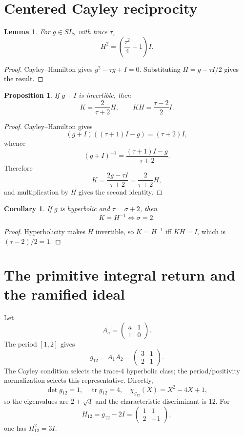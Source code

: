 \documentclass[11pt]{article}
\newtheorem{proposition}[theorem]{Proposition}
\newtheorem{corollary}[theorem]{Corollary}
\newtheorem{lemma}[theorem]{Lemma}
\theoremstyle{remark}
\newcommand{\tr}{\operatorname{tr}}
\begin{document}
\section{Centered Cayley reciprocity}

\begin{lemma}
For $g\in SL_2$ with trace $\tau$,
\[
H^2=\left(\frac{\tau^2}{4}-1\right)I.
\]
\end{lemma}
\begin{proof}
Cayley--Hamilton gives $g^2-\tau g+I=0$.  Substituting
$H=g-\tau I/2$ gives the result.
\end{proof}

\begin{proposition}
If $g+I$ is invertible, then
\[
K=\frac{2}{\tau+2}H,
\qquad KH=\frac{\tau-2}{2}I.
\]
\end{proposition}
\begin{proof}
Cayley--Hamilton gives
\[
(g+I)((\tau+1)I-g)=(\tau+2)I,
\]
whence
\[
(g+I)^{-1}=\frac{(\tau+1)I-g}{\tau+2}.
\]
Therefore
\[
K=\frac{2g-\tau I}{\tau+2}=\frac{2}{\tau+2}H,
\]
and multiplication by $H$ gives the second identity.
\end{proof}

\begin{corollary}
If $g$ is hyperbolic and $\tau=\sigma+2$, then
\[
K=H^{-1}\iff\sigma=2.
\]
\end{corollary}
\begin{proof}
Hyperbolicity makes $H$ invertible, so $K=H^{-1}$ iff $KH=I$, which is
$(\tau-2)/2=1$.
\end{proof}

\section{The primitive integral return and the ramified ideal}

Let
\[
A_a=\begin{pmatrix}a&1\\1&0\end{pmatrix}.
\]
The period $[1,2]$ gives
\[
g_{12}=A_1A_2=\begin{pmatrix}3&1\\2&1\end{pmatrix}.
\]
The Cayley condition selects the trace-$4$ hyperbolic class; the
period/positivity normalization selects this representative.  Directly,
\[
\det g_{12}=1,
\quad \tr g_{12}=4,
\quad \chi_{g_{12}}(X)=X^2-4X+1,
\]
so the eigenvalues are $2\pm\sqrt3$ and the characteristic discriminant is
$12$.  For
\[
H_{12}=g_{12}-2I=\begin{pmatrix}1&1\\2&-1\end{pmatrix},
\]
one has $H_{12}^2=3I$.
\end{document}
